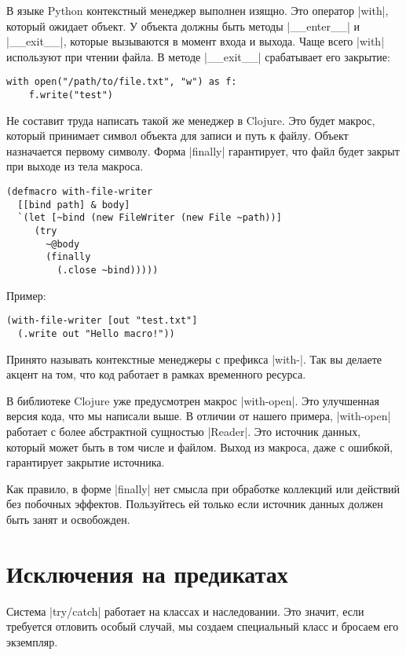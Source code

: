 В языке Python контекстный менеджер выполнен изящно. Это оператор \spverb|with|,
который ожидает объект. У объекта должны быть методы \spverb|__enter__| и \spverb|__exit__|,
которые вызываются в момент входа и выхода. Чаще всего \spverb|with| используют при
чтении файла. В методе \spverb|__exit__| срабатывает его закрытие:

\begin{verbatim}
with open("/path/to/file.txt", "w") as f:
    f.write("test")
\end{verbatim}

Не составит труда написать такой же менеджер в Clojure. Это будет макрос,
который принимает символ объекта для записи и путь к файлу. Объект назначается
первому символу. Форма \spverb|finally| гарантирует, что файл будет закрыт при выходе
из тела макроса.

\begin{verbatim}
(defmacro with-file-writer
  [[bind path] & body]
  `(let [~bind (new FileWriter (new File ~path))]
     (try
       ~@body
       (finally
         (.close ~bind)))))
\end{verbatim}

Пример:

\begin{verbatim}
(with-file-writer [out "test.txt"]
  (.write out "Hello macro!"))
\end{verbatim}

Принято называть контекстные менеджеры с префикса \spverb|with-|. Так вы делаете акцент
на том, что код работает в рамках временного ресурса.

В библиотеке Clojure уже предусмотрен макрос \spverb|with-open|. Это улучшенная версия
кода, что мы написали выше. В отличии от нашего примера, \spverb|with-open| работает с
более абстрактной сущностью \spverb|Reader|. Это источник данных, который может быть в
том числе и файлом. Выход из макроса, даже с ошибкой, гарантирует закрытие
источника.

Как правило, в форме \spverb|finally| нет смысла при обработке коллекций или действий
без побочных эффектов. Пользуйтесь ей только если источник данных должен быть
занят и освобожден.

\section{Исключения на предикатах}

Система \spverb|try/catch| работает на классах и наследовании. Это значит, если
требуется отловить особый случай, мы создаем специальный класс и бросаем его
экземпляр.

